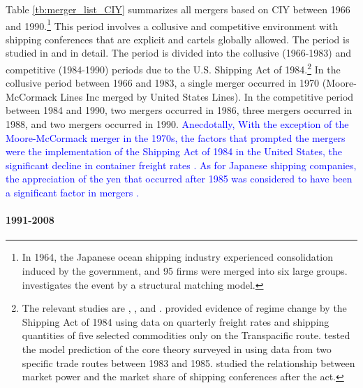 \documentclass[10pt]{article}
\begin{document}
Table \ref{tb:merger_list_CIY} summarizes all mergers based on CIY between 1966 and 1990.\footnote{In 1964, the Japanese ocean shipping industry experienced consolidation induced by the government, and 95 firms were merged into six large groups. \cite{otani2021estimating} investigates the event by a structural matching model.}
This period involves a collusive and competitive environment with shipping conferences that are explicit and cartels globally allowed. 
The period is studied in \cite{matsuda2022unified} and \cite{otani2023industry} in detail.
The period is divided into the collusive (1966-1983) and competitive (1984-1990) periods due to the U.S. Shipping Act of 1984.\footnote{The relevant studies are \cite{wilson1991some}, \cite{pirrong1992application}, and \cite{clyde1998market}. \cite{wilson1991some} provided evidence of regime change by the Shipping Act of 1984 using data on quarterly freight rates and shipping quantities of five selected commodities only on the Transpacific route. \cite{pirrong1992application} tested the model prediction of the core theory surveyed in \cite{sjostrom2013competition} using data from two specific trade routes between 1983 and 1985. \cite{clyde1998market} studied the relationship between market power and the market share of shipping conferences after the act. }
In the collusive period between 1966 and 1983, a single merger occurred in 1970 (Moore-McCormack Lines Inc merged by United States Lines). %
In the competitive period between 1984 and 1990, two mergers occurred in 1986, three mergers occurred in 1988, and two mergers occurred in 1990. 
\textcolor{blue}{Anecdotally, With the exception of the Moore-McCormack merger in the 1970s, the factors that prompted the mergers were the implementation of the Shipping Act of 1984 in the United States, the significant decline in container freight rates \citep{matsuda2022unified}. As for Japanese shipping companies, the appreciation of the yen that occurred after 1985 was considered to have been a significant factor in mergers  \citep{Duru2018}.}

\paragraph{1991-2008}
\end{document}
